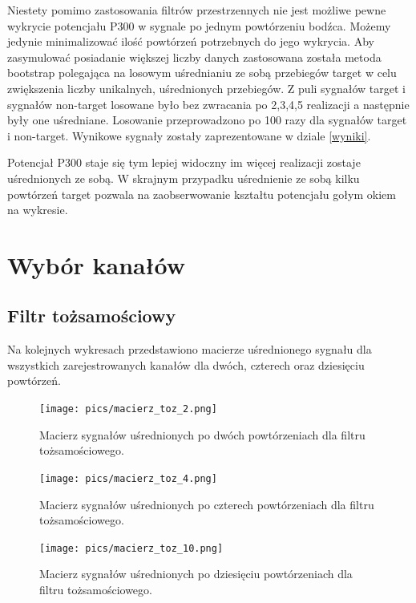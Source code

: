 \documentclass[licencjacka,openright]{pracamgr}
\begin{document}
Niestety pomimo zastosowania filtrów przestrzennych nie jest możliwe pewne wykrycie potencjału P300 w sygnale po jednym powtórzeniu bodźca. Możemy jedynie minimalizować ilość powtórzeń potrzebnych do jego wykrycia. Aby zasymulować posiadanie większej liczby danych zastosowana została metoda bootstrap polegająca na losowym uśrednianiu ze sobą przebiegów target w celu zwiększenia liczby unikalnych, uśrednionych przebiegów. Z puli sygnałów target i sygnałów non-target losowane było bez zwracania po 2,3,4,5 realizacji a następnie były one uśredniane. Losowanie przeprowadzono po 100 razy dla sygnałów target i non-target. Wynikowe sygnały zostały zaprezentowane w dziale \ref{wyniki}.

Potencjał P300 staje się tym lepiej widoczny im więcej realizacji zostaje uśrednionych ze sobą. W skrajnym przypadku uśrednienie ze sobą kilku powtórzeń target pozwala na zaobserwowanie kształtu potencjału gołym okiem na wykresie.

\section{Wybór kanałów}
\label{sygnaly}
\subsection{Filtr tożsamościowy}

Na kolejnych wykresach przedstawiono macierze uśrednionego sygnału dla wszystkich zarejestrowanych kanałów dla dwóch, czterech oraz dziesięciu powtórzeń.


\begin{figure}[H]
\centering
\texttt{[image: pics/macierz\_toz\_2.png]}
\caption{Macierz sygnałów uśrednionych po dwóch powtórzeniach dla filtru tożsamościowego.}
\label{maciez_toz_2}
\end{figure}

\begin{figure}[H]
\centering
\texttt{[image: pics/macierz\_toz\_4.png]}
\caption{Macierz sygnałów uśrednionych po czterech powtórzeniach dla filtru tożsamościowego.}
\label{maciez_toz_4}
\end{figure}

\begin{figure}[H]
\centering
\texttt{[image: pics/macierz\_toz\_10.png]}
\caption{Macierz sygnałów uśrednionych po dziesięciu powtórzeniach dla filtru tożsamościowego.}
\label{maciez_toz_10}
\end{figure}
\end{document}
